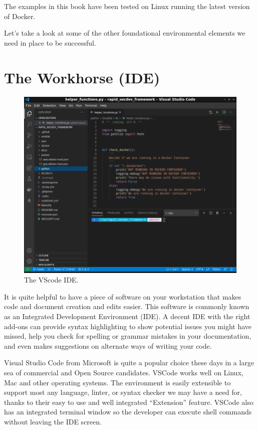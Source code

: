\justify{}
The examples in this book have been tested on Linux running the latest
version of Docker.

\justify{}
Let's take a look at some of the other foundational environmental
elements we need in place to be successful.

\section{The Workhorse (IDE)}

\begin{figure}[!htb]
\centering
\includegraphics[scale=0.45]{../images/setup-vscode.png}
\caption{The VScode IDE.}
\end{figure}

\justify{}
It is quite helpful to have a piece of software on your workstation that
makes code and document creation and edits easier. This software is
commonly known as an Integrated Development Environment (IDE).
A decent IDE with the right add-ons can provide syntax highlighting to show
potential issues you might have missed, help you check for spelling or
grammar mistakes in your documentation, and even makes suggestions on
alternate ways of writing your code.

\justify{}
Visual Studio Code from Microsoft is quite a popular choice these
days in a large sea of commercial and Open Source candidates.
VSCode works well on Linux, Mac and other operating systems.
The environment is easily extensible to support most any language,
linter, or syntax checker we may have a need
for, thanks to their easy to use and well integrated ``Extension''
feature. VSCode also has an integrated terminal window
so the developer can execute shell commands without leaving the IDE screen.

